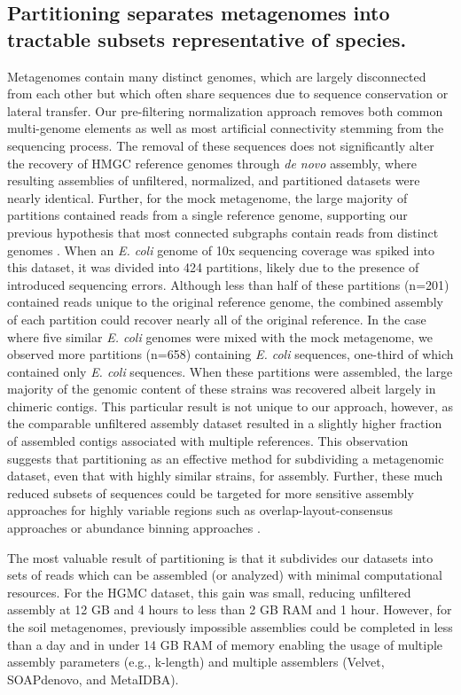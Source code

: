 \documentclass{pnastwo}
\begin{document}
\begin{article}
\subsection*{Partitioning separates metagenomes into tractable subsets representative of species.}
Metagenomes contain many distinct genomes, which are largely disconnected from
each other but which often share sequences due to sequence conservation or
lateral transfer. Our pre-filtering normalization approach removes both common multi-genome
elements as well as most artificial connectivity stemming from the sequencing
process. The removal of these sequences does not significantly alter the
recovery of HMGC reference genomes through {\em de novo} assembly, where resulting  
assemblies of unfiltered, normalized, and
partitioned datasets were nearly identical.  Further, for the mock metagenome, the large majority of
partitions contained reads from a single reference genome, supporting our
previous hypothesis that most connected subgraphs contain reads from distinct
genomes \cite{Pell:2012cq}.  When an \emph{E. coli} genome of 10x sequencing coverage was spiked into this dataset, it was divided into 424 partitions, likely due to the presence of introduced sequencing errors.  Although less than half of these partitions (n=201) contained reads unique to the original reference genome, the combined assembly of each partition could recover nearly all of the original reference.  In the case where five similar \emph{E. coli} genomes were mixed with the mock metagenome, we observed more partitions (n=658) containing \emph{E. coli} sequences, one-third of which contained only \emph{E. coli} sequences.  When these partitions were assembled, the large majority of the
genomic content of these strains was recovered albeit largely in chimeric contigs. This particular
result is not unique to our approach, however, as the comparable unfiltered assembly 
dataset resulted in a slightly higher fraction of assembled contigs associated
with multiple references.  This observation suggests that partitioning as an effective method for subdividing a metagenomic dataset, even that with highly similar strains, for assembly.  Further, these much reduced subsets of
sequences could be targeted for more sensitive assembly approaches for highly
variable regions such as overlap-layout-consensus approaches or abundance binning
approaches \cite{Sharon:2012kx}.

The most valuable result of partitioning is that it subdivides our datasets into sets
of reads which can be assembled (or analyzed) with minimal computational resources. For the
HGMC dataset, this gain was small, reducing unfiltered assembly at 12 GB and 4
hours to less than 2 GB RAM and 1 hour. However, for the soil metagenomes,
previously impossible assemblies could be completed in less than a day and in
under 14 GB RAM of memory enabling the usage of multiple assembly parameters (e.g.,
k-length) and multiple assemblers (Velvet, SOAPdenovo, and MetaIDBA).


\end{article}
\end{document}
